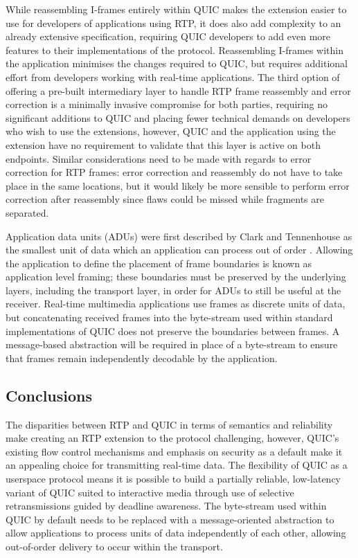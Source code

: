 \documentclass{mprop}
\begin{document}
While reassembling I-frames entirely within QUIC makes the extension easier to use for developers of applications using RTP, it does also add complexity to an already extensive specification, requiring QUIC developers to add even more features to their implementations of the protocol. Reassembling I-frames within the application minimises the changes required to QUIC, but requires additional effort from developers working with real-time applications. The third option of offering a pre-built intermediary layer to handle RTP frame reassembly and error correction is a minimally invasive compromise for both parties, requiring no significant additions to QUIC and placing fewer technical demands on developers who wish to use the extensions, however, QUIC and the application using the extension have no requirement to validate that this layer is active on both endpoints. Similar considerations need to be made with regards to error correction for RTP frames: error correction and reassembly do not have to take place in the same locations, but it would likely be more sensible to perform error correction after reassembly since flaws could be missed while fragments are separated.

Application data units (ADUs) were first described by Clark and Tennenhouse as the smallest unit of data which an application can process out of order \cite{Clark1990}. Allowing the application to define the placement of frame boundaries is known as application level framing; these boundaries must be preserved by the underlying layers, including the transport layer, in order for ADUs to still be useful at the receiver. Real-time multimedia applications use frames as discrete units of data, but concatenating received frames into the byte-stream used within standard implementations of QUIC does not preserve the boundaries between frames. A message-based abstraction will be required in place of a byte-stream to ensure that frames remain independently decodable by the application.

\subsection{Conclusions}

The disparities between RTP and QUIC in terms of semantics and reliability make creating an RTP extension to the protocol challenging, however, QUIC's existing flow control mechanisms and emphasis on security as a default make it an appealing choice for transmitting real-time data. The flexibility of QUIC as a userspace protocol means it is possible to build a partially reliable, low-latency variant of QUIC suited to interactive media through use of selective retransmissions guided by deadline awareness. The byte-stream used within QUIC by default needs to be replaced with a message-oriented abstraction to allow applications to process units of data independently of each other, allowing out-of-order delivery to occur within the transport.
\end{document}
